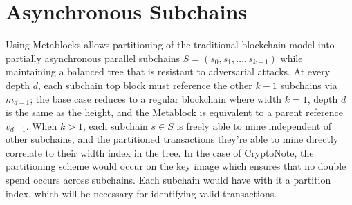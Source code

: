 \documentclass{article}
\begin{document}
\section{Asynchronous Subchains}
Using Metablocks allows partitioning of the traditional blockchain model into partially asynchronous parallel subchains $S = (s_0, s_1, \ldots, s_{k-1})$ while maintaining a balanced tree that is resistant to adversarial attacks. At every depth $d$, each subchain top block must reference the other $k-1$ subchains via $m_{d-1}$; the base case reduces to a regular blockchain where width $k = 1$, depth $d$ is the same as the height, and the Metablock is equivalent to a parent reference $v_{d-1}$. When $k > 1$, each subchain $s \in S$ is freely able to mine independent of other subchains, and the partitioned transactions they're able to mine directly correlate to their width index in the tree. In the case of CryptoNote\cite{saberhagen}, the partitioning scheme would occur on the key image which ensures that no double spend occurs across subchains. Each subchain would have with it a partition index, which will be necessary for identifying valid transactions.
\end{document}
